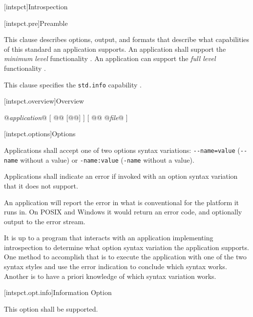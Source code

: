 
[intspct]{Introspection}

[intspct.pre]{Preamble}

\pnum
This clause describes options, output, and formats that describe what
capabilities of this standard an application supports. An application shall
support the \emph{minimum level} functionality . An
application can support the \emph{full level} functionality .

\pnum
This clause specifies the \verb|std.info| capability .

[intspct.overview]{Overview}

\pnum
\begin{outputblock}
@\emph{application}@ [ @@ [@@] ] [ @@ @\emph{file}@ ]
\end{outputblock}

[intspct.options]{Options}

\pnum
Applications shall accept one of two options syntax variations:
\verb|--name=value| (\verb|--name| without a value) or
\verb|-name:value| (\verb|-name| without a value).

\pnum
Applications shall indicate an error if invoked with an option syntax variation
that it does not support.

\begin{note}
	An application will report the error in what is conventional for the
	platform it runs in. On POSIX and Windows it would return an error code,
	and optionally output to the error stream.
\end{note}

\begin{note}
	It is up to a program that interacts with an application implementing
	introspection to determine what option syntax variation the application
	supports. One method to accomplish that is to execute the application with
	one of the two syntax styles and use the error indication to conclude which
	syntax works. Another is to have a priori knowledge of which syntax
	variation works.
\end{note}

[intspct.opt.info]{Information Option}

\pnum
This option shall be supported.

